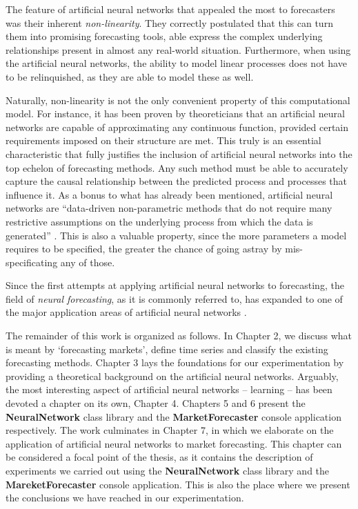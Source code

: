\medskip

The feature of artificial neural networks that appealed the most to forecasters was their inherent \textit{non-linearity}. They correctly postulated that this can turn them into promising forecasting tools, able express the complex underlying relationships present in almost any real-world situation. Furthermore, when using the artificial neural networks, the ability to model linear processes does not have to be relinquished, as they are able to model these as well.

Naturally, non-linearity is not the only convenient property of this computational model. For instance, it has been proven by theoreticians that an artificial neural networks are capable of approximating any continuous function, provided certain requirements imposed on their structure are met. This truly is an essential characteristic that fully justifies the inclusion of artificial neural networks into the top echelon of forecasting methods. Any such method must be able to accurately capture the causal relationship between the predicted process and processes that influence it. As a bonus to what has already been mentioned, artificial neural networks are ``data-driven non-parametric methods that do not require many restrictive assumptions on the underlying process from which the data is generated'' \cite{Zhang04}. This is also a valuable property, since the more parameters a model requires to be specified, the greater the chance of going astray by mis-specificating any of those.

Since the first attempts at applying artificial neural networks to forecasting, the field of \textit{neural forecasting}, as it is commonly referred to, has expanded to one of the major application areas of artificial neural networks \cite{Zhang04}.

\medskip

The remainder of this work is organized as follows. In Chapter 2, we discuss what is meant by `forecasting markets', define time series and classify the existing forecasting methods. Chapter 3 lays the foundations for our experimentation by providing a theoretical background on the artificial neural networks. Arguably, the most interesting aspect of artificial neural networks -- learning -- has been devoted a chapter on its own, Chapter 4. Chapters 5 and 6 present the \textbf{NeuralNetwork} class library and the \textbf{MarketForecaster} console application respectively. The work culminates in Chapter 7, in which we elaborate on the application of artificial neural networks to market forecasting. This chapter can be considered a focal point of the thesis, as it contains the description of experiments we carried out using the \textbf{NeuralNetwork} class library and the \textbf{MareketForecaster} console application. This is also the place where we present the conclusions we have reached in our experimentation.